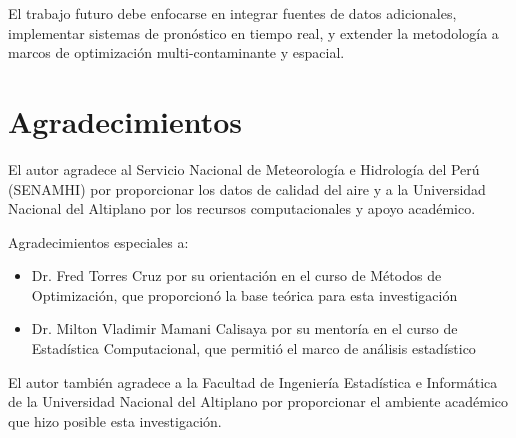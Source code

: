 \documentclass[conference]{IEEEtran}
\begin{document}
El trabajo futuro debe enfocarse en integrar fuentes de datos adicionales, implementar sistemas de pronóstico en tiempo real, y extender la metodología a marcos de optimización multi-contaminante y espacial.

\section*{Agradecimientos}

El autor agradece al Servicio Nacional de Meteorología e Hidrología del Perú (SENAMHI) por proporcionar los datos de calidad del aire y a la Universidad Nacional del Altiplano por los recursos computacionales y apoyo académico.

Agradecimientos especiales a:
\begin{itemize}
    \item Dr. Fred Torres Cruz por su orientación en el curso de Métodos de Optimización, que proporcionó la base teórica para esta investigación
    \item Dr. Milton Vladimir Mamani Calisaya por su mentoría en el curso de Estadística Computacional, que permitió el marco de análisis estadístico
\end{itemize}

El autor también agradece a la Facultad de Ingeniería Estadística e Informática de la Universidad Nacional del Altiplano por proporcionar el ambiente académico que hizo posible esta investigación.
\end{document}
